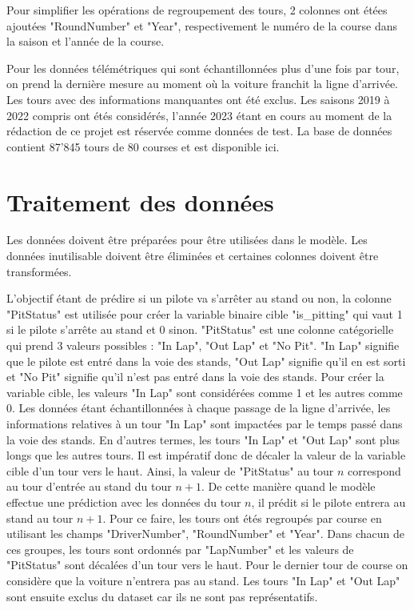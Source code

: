 Pour simplifier les opérations de regroupement des tours, 2 colonnes ont étées ajoutées "RoundNumber" et "Year", respectivement le numéro de la course dans la saison et l'année de la course.

Pour les données télémétriques qui sont échantillonnées plus d'une fois par tour,
on prend la dernière mesure au moment où la voiture franchit la ligne d'arrivée.
Les tours avec des informations manquantes ont été exclus.
Les saisons 2019 à 2022 compris ont étés considérés, l'année 2023 étant en cours au moment de la rédaction de ce projet
est réservée comme données de test. La base de données contient 87'845 tours de 80 courses et est disponible ici. %

\section{Traitement des données}
Les données doivent être préparées pour être utilisées dans le modèle. Les données inutilisable doivent être éliminées
et certaines colonnes doivent être transformées.

L'objectif étant de prédire si un pilote va s'arrêter au stand ou non, la colonne "PitStatus" est utilisée pour créer la variable binaire cible "is_pitting" qui vaut 1 si le pilote s'arrête au stand et 0 sinon.
"PitStatus" est une colonne catégorielle qui prend 3 valeurs possibles : "In Lap", "Out Lap" et "No Pit".
"In Lap" signifie que le pilote est entré dans la voie des stands, "Out Lap" signifie qu'il en est sorti et "No Pit" signifie qu'il n'est pas entré dans la voie des stands.
Pour créer la variable cible, les valeurs "In Lap" sont considérées comme 1 et les autres comme 0.
Les données étant échantillonnées à chaque passage de la ligne d'arrivée, les informations relatives à un tour "In Lap" sont impactées par le temps passé dans la voie des stands.
En d'autres termes, les tours "In Lap" et "Out Lap" sont plus longs que les autres tours. Il est impératif donc de décaler la valeur de la variable cible d'un tour vers le haut.
Ainsi, la valeur de "PitStatus" au tour $n$ correspond au tour d'entrée au stand du tour $n+1$.
De cette manière quand le modèle effectue une prédiction avec les données du tour $n$, il prédit si le pilote entrera au stand au tour $n+1$.
Pour ce faire, les tours ont étés regroupés par course en utilisant les champs "DriverNumber", "RoundNumber" et "Year".
Dans chacun de ces groupes, les tours sont ordonnés par "LapNumber" et les valeurs de "PitStatus" sont décalées d'un tour vers le haut. Pour le dernier tour de course on considère que la voiture n'entrera pas au stand.
Les tours "In Lap" et "Out Lap" sont ensuite exclus du dataset car ils ne sont pas représentatifs.

